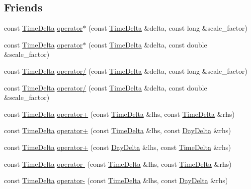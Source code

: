 \subsection*{Friends}
\begin{DoxyCompactItemize}
\item 
const \hyperlink{structTimeDelta}{Time\-Delta} \hyperlink{structTimeDelta_aad6d6cd5e8590685e574a3fa0eb22f4c}{operator$\ast$} (const \hyperlink{structTimeDelta}{Time\-Delta} \&delta, const long \&scale\-\_\-factor)
\item 
const \hyperlink{structTimeDelta}{Time\-Delta} \hyperlink{structTimeDelta_adab5720acc96114e1dc60fee9e515cb8}{operator$\ast$} (const \hyperlink{structTimeDelta}{Time\-Delta} \&delta, const double \&scale\-\_\-factor)
\item 
const \hyperlink{structTimeDelta}{Time\-Delta} \hyperlink{structTimeDelta_a99a1330613b755b938fb1e306f2d4f64}{operator/} (const \hyperlink{structTimeDelta}{Time\-Delta} \&delta, const long \&scale\-\_\-factor)
\item 
const \hyperlink{structTimeDelta}{Time\-Delta} \hyperlink{structTimeDelta_aa3ef692470498914c3a3da20f5689333}{operator/} (const \hyperlink{structTimeDelta}{Time\-Delta} \&delta, const double \&scale\-\_\-factor)
\item 
const \hyperlink{structTimeDelta}{Time\-Delta} \hyperlink{structTimeDelta_ab9dcf443fb6dde4d15657f270e5f1111}{operator+} (const \hyperlink{structTimeDelta}{Time\-Delta} \&lhs, const \hyperlink{structTimeDelta}{Time\-Delta} \&rhs)
\item 
const \hyperlink{structTimeDelta}{Time\-Delta} \hyperlink{structTimeDelta_a8f6bef028089b857d7d4a1e14ab81d9a}{operator+} (const \hyperlink{structTimeDelta}{Time\-Delta} \&lhs, const \hyperlink{structDayDelta}{Day\-Delta} \&rhs)
\item 
const \hyperlink{structTimeDelta}{Time\-Delta} \hyperlink{structTimeDelta_adfb48eb9c656f4705fa593c8b58bc80f}{operator+} (const \hyperlink{structDayDelta}{Day\-Delta} \&lhs, const \hyperlink{structTimeDelta}{Time\-Delta} \&rhs)
\item 
const \hyperlink{structTimeDelta}{Time\-Delta} \hyperlink{structTimeDelta_a0298dd60abe0bb412961af7325925999}{operator-\/} (const \hyperlink{structTimeDelta}{Time\-Delta} \&lhs, const \hyperlink{structTimeDelta}{Time\-Delta} \&rhs)
\item 
const \hyperlink{structTimeDelta}{Time\-Delta} \hyperlink{structTimeDelta_ab4c141e3692561a153127782bda9a9f8}{operator-\/} (const \hyperlink{structTimeDelta}{Time\-Delta} \&lhs, const \hyperlink{structDayDelta}{Day\-Delta} \&rhs)

\end{DoxyCompactItemize}
